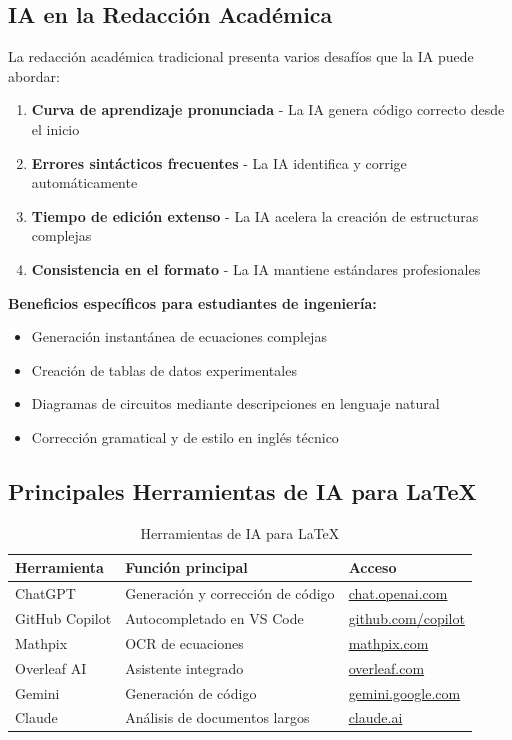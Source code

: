 \documentclass[11pt,letterpaper]{article}
\begin{document}
\subsection{IA en la Redacción Académica}

La redacción académica tradicional presenta varios desafíos que la IA puede abordar:

\begin{enumerate}
	\item \textbf{Curva de aprendizaje pronunciada} - La IA genera código correcto desde el inicio
	\item \textbf{Errores sintácticos frecuentes} - La IA identifica y corrige automáticamente
	\item \textbf{Tiempo de edición extenso} - La IA acelera la creación de estructuras complejas
	\item \textbf{Consistencia en el formato} - La IA mantiene estándares profesionales
\end{enumerate}

\begin{cajaiaclaro}
	\textbf{Beneficios específicos para estudiantes de ingeniería:}
	\begin{itemize}
		\item Generación instantánea de ecuaciones complejas
		\item Creación de tablas de datos experimentales
		\item Diagramas de circuitos mediante descripciones en lenguaje natural
		\item Corrección gramatical y de estilo en inglés técnico
	\end{itemize}
\end{cajaiaclaro}

\subsection{Principales Herramientas de IA para \LaTeX}

\begin{table}[H]
	\centering
	\begin{tabular}{@{}p{}p{}p{}@{}}
		\toprule
		\textbf{Herramienta} & \textbf{Función principal} & \textbf{Acceso} \\
		\midrule
		ChatGPT & Generación y corrección de código & \url{chat.openai.com} \\
		GitHub Copilot & Autocompletado en VS Code & \url{github.com/copilot} \\
		Mathpix & OCR de ecuaciones & \url{mathpix.com} \\
		Overleaf AI & Asistente integrado & \url{overleaf.com} \\
		Gemini & Generación de código & \url{gemini.google.com} \\
		Claude & Análisis de documentos largos & \url{claude.ai} \\
		\bottomrule
	\end{tabular}
	\caption{Herramientas de IA para \LaTeX}
	\label{tab:herramientas}
\end{table}
\end{document}
